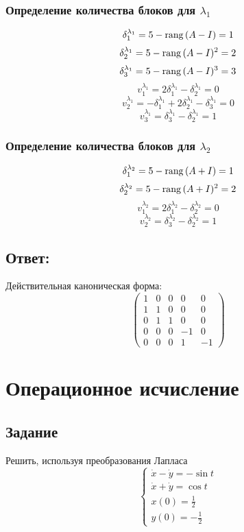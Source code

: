 \documentclass[a4paper,10pt,notitlepage,pdftex,headsepline]{scrartcl}
\def\rang{\mathop{\rm rang}}
\begin{document}
\subsubsection*{Определение количества блоков для $\lambda_1$}
\[\delta^{\lambda_1}_1 = 5 - \rang{(A - I)} = 1\]
\[\delta^{\lambda_1}_2 = 5 - \rang{(A - I)^2} = 2\]
\[\delta^{\lambda_1}_3 = 5 - \rang{(A - I)^3} = 3\]
\[v^{\lambda_1}_1 = 2 \delta^{\lambda_1}_1 - \delta^{\lambda_1}_2 = 0\]
\[v^{\lambda_1}_2 = -\delta^{\lambda_1}_1 + 2 \delta^{\lambda_1}_2 - \delta^{\lambda_1}_3 = 0\]
\[v^{\lambda_1}_3 = \delta^{\lambda_1}_3 - \delta^{\lambda_1}_2 = 1\]
\subsubsection*{Определение количества блоков для $\lambda_2$}
\[\delta^{\lambda_2}_1 = 5 - \rang{(A + I)} = 1\]
\[\delta^{\lambda_2}_2 = 5 - \rang{(A + I)^2} = 2\]
\[v^{\lambda_2}_1 = 2 \delta^{\lambda_2}_1 - \delta^{\lambda_2}_2 = 0\]
\[v^{\lambda_2}_2 = \delta^{\lambda_2}_3 - \delta^{\lambda_2}_2 = 1\]
\subsection*{Ответ:}
Действительная каноническая форма:
\[\left(\begin{matrix}
1 & 0 & 0 & 0 & 0\\
1 & 1 & 0 & 0 & 0\\
0 & 1 & 1 & 0 & 0\\
0 & 0 & 0 & -1 & 0\\
0 & 0 & 0 & 1 & -1
\end{matrix}\right)
\]
\newpage
\section{Операционное исчисление}
\subsection*{Задание}
Решить, используя преобразования Лапласа
\[
\begin{cases}
\dot{x} - \dot{y} = -\sin{t}\\
\dot{x} + \dot{y} = \cos{t}\\
x(0) = \frac{1}{2}\\
y(0) = -\frac{1}{2}
\end{cases}
\]
\end{document}
